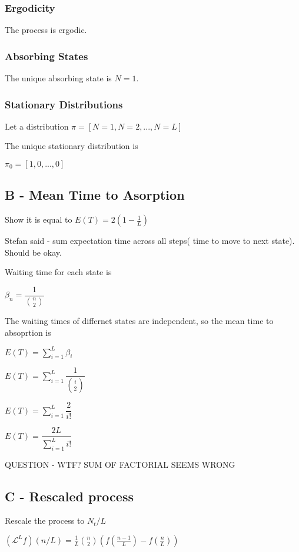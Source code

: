 \documentclass{article}
\begin{document}
\subsubsection{Ergodicity}

The process is ergodic.

\subsubsection{Absorbing States}

The unique absorbing state is $N = 1$.

\subsubsection{Stationary Distributions}

Let a distribution $\pi = [N=1, N=2,... ,N=L]$

The unique stationary distribution is 

$\pi_0 = [1,0,...,0]$


\subsection{B - Mean Time to Asorption}

Show it is equal to $E(T) = 2(1-\frac{1}{L})$

Stefan said - sum expectation time across all steps( time to move to next state). Should be okay. 

Waiting time for each state is 

$\beta_n = \dfrac{1}{{n\choose 2}}$

The waiting times of differnet states are independent, so the mean time to absoprtion is

$E(T) = \sum_{i=1}^L \beta_i$

$E(T) = \sum_{i=1}^L \dfrac{1}{{i\choose 2}}$

$E(T) = \sum_{i=1}^L \dfrac{2}{i!}$

$E(T) = \dfrac{2L}{\sum_{i=1}^Li!}$

QUESTION - WTF? SUM OF FACTORIAL SEEMS WRONG


\subsection{C - Rescaled process}

Rescale the process to $N_t/L$

$(\mathcal{L}^Lf)(n/L) = \frac{1}{L} {n\choose2} (f(\frac{n-1}{L}) - f(\frac{n}{L}))$
\end{document}
